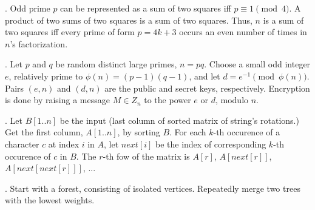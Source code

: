 .  Odd prime $p$ can be represented
as a sum of two squares iff $p \equiv 1 {\pmod 4}$.
A product of two sums of two squares is a sum of two squares.
Thus, $n$ is a sum of two squares iff every prime of
form $p=4k+3$ occurs an even number of times in $n$'s factorization.

. Let $p$ and $q$ be random distinct large primes, $n = pq$.
Choose a small odd integer $e$, relatively prime to $\phi(n) = (p-1)(q-1)$,
and let $d = e^{-1} \pmod{\phi(n)}$. Pairs $(e,n)$ and $(d,n)$ are
the public and secret keys, respectively.
Encryption is done by raising a message $M \in Z_n$ to the power $e$ or $d$,
modulo $n$.




.
Let $B[1..n]$ be the input (last column of sorted matrix of string's rotations.)
Get the first column, $A[1..n]$, by sorting $B$.
For each $k$-th occurence of a character $c$ at index $i$ in $A$,
let $next[i]$ be the index of corresponding $k$-th occurence of $c$ in $B$.
The $r$-th fow of the matrix is $A[r]$, $A[next[r]]$, $A[next[next[r]]]$, ...

.  Start with a forest, consisting of isolated
vertices.  Repeatedly merge two trees with the lowest weights.
